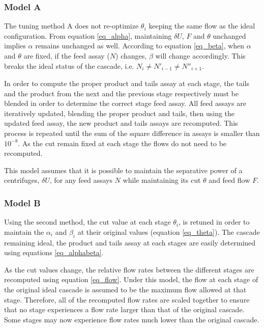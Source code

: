 \subsubsection{Model A}

The tuning method A does not re-optimize $\theta_i$ keeping the same flow as the
ideal configuration. From equation \eqref{eq_alpha}, maintaining $\delta U$, $F$
and $\theta$ unchanged implies $\alpha$ remains unchanged as well. According to
equation \eqref{eq_beta}, when $\alpha$ and $\theta$ are fixed, if the feed
assay ($N$) changes, $\beta$ will change accordingly.  This breaks the
ideal status of the cascade, i.e. $N_{i} \neq N'_{i-1} \neq N''_{i+1}$.


In order to compute the proper product and tails assay at each stage, the tails
and the product from the next and the previous stage respectively must be
blended in order to determine the correct stage feed assay. All feed assays are
iteratively updated, blending the proper product and tails, then using the
updated feed assay, the new product and tails assays are recomputed. This
process is repeated until the sum of the square difference in assays is smaller
than $10^{-8}$.  As the cut remain fixed at each stage the flows do not need to
be recomputed.

This model assumes that it is possible to maintain the separative power of a
centrifuges, $\delta U$, for any feed assays $N$ while maintaining its cut
$\theta$ and feed flow $F$.

\subsubsection{Model B}

Using the second method, the cut value at each stage $\theta_i$, is retuned in
order to maintain the $\alpha_i$ and $\beta_i$ at their original values
(equation \eqref{eq_theta}). The cascade remaining ideal, the product and tails
assay at each stages are easily determined using equations \eqref{eq_alphabeta}.

As the cut values change, the relative flow rates between the different stages
are recomputed using equation \eqref{eq_flow}.  Under this model, the flow at
each stage of the original ideal cascade is assumed to be the maximum flow
allowed at that stage.  Therefore, all of the recomputed flow rates are scaled
together to ensure that no stage experiences a flow rate larger than that of
the original cascade.  Some stages may now experience flow rates much lower
than the original cascade.

